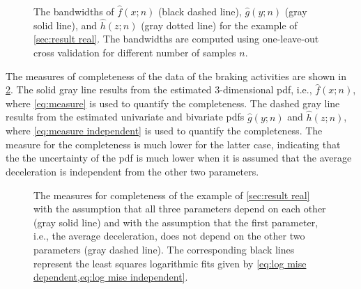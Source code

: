 \setlength{}
\setlength{}
\begin{figure}
	\centering
	
	\caption{The bandwidths of $\hat{f}(x;n)$ (black dashed line), $\hat{g}(y;n)$ (gray solid line), and $\hat{h}(z;n)$ (gray dotted line) for the example of \cref{sec:result real}. The bandwidths are computed using one-leave-out cross validation for different number of samples $n$.}
	\label{fig:bandwidth real}
\end{figure}

The measures of completeness of the data of the braking activities are shown in \cref{fig:mise real}. The solid gray line results from the estimated 3-dimensional pdf, i.e., $\hat{f}(x;n)$, where \cref{eq:measure} is used to quantify the completeness. The dashed gray line results from the estimated univariate and bivariate pdfs $\hat{g}(y;n)$ and $\hat{h}(z;n)$, where \cref{eq:measure independent} is used to quantify the completeness. The measure for the completeness is much lower for the latter case, indicating that the the uncertainty of the pdf is much lower when it is assumed that the average deceleration is independent from the other two parameters.

\setlength\figurewidth{\linewidth}
\setlength\figureheight{\linewidth}
\begin{figure}
	\centering
	
	\caption{The measures for completeness of the example of \cref{sec:result real} with the assumption that all three parameters depend on each other (gray solid line) and with the assumption that the first parameter, i.e., the average deceleration, does not depend on the other two parameters (gray dashed line). The corresponding black lines represent the least squares logarithmic fits given by \cref{eq:log mise dependent,eq:log mise independent}.}
	\label{fig:mise real}
\end{figure}

